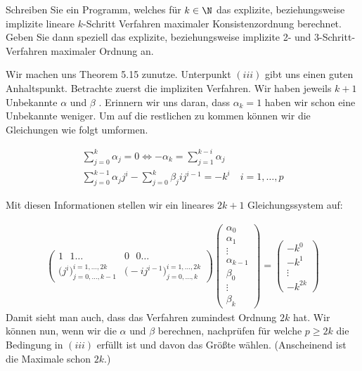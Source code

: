\begin{exercise}
Schreiben Sie ein Programm, welches für $k \in \N$ das explizite, beziehungsweise
implizite lineare $k$-Schritt Verfahren maximaler Konsistenzordnung berechnet. Geben Sie dann speziell
das explizite, beziehungsweise implizite 2- und 3-Schritt-Verfahren maximaler Ordnung an.
\end{exercise}
\begin{solution}
Wir machen uns Theorem 5.15 zunutze. 
Unterpunkt $(iii)$ gibt uns einen guten Anhaltspunkt. Betrachte zuerst die impliziten Verfahren.
Wir haben jeweils $k+1$ Unbekannte $\alpha$ und $\beta$ . Erinnern wir uns daran,
dass $\alpha_k = 1$ haben wir schon eine Unbekannte weniger. Um auf die restlichen
zu kommen können wir die Gleichungen wie folgt umformen.

\begin{align*}
  \sum_{j=0}^k \alpha_j = 0 \Leftrightarrow -\alpha_k = \sum_{j=1}^{k-i} \alpha_j \\
  \sum_{j=0}^{k-1}\alpha_j j^i - \sum_{j=0}^k \beta_j ij^{i-1} = -k^i \quad i=1,\dots,p
\end{align*}

Mit diesen Informationen stellen wir ein lineares $2k+1$ Gleichungssystem auf:

\begin{align*}
  \left(\begin{array}{c|c}
    1 \text{ }1\dots & 0\text{ } 0 \dots \\
    \hline
    \bigg( j^i\bigg)_{j=0,\dots,k-1}^{i=1,\dots,2k} & \bigg( -ij^{i-1}\bigg)_{j=0,\dots,k}^{i=1,\dots,2k}
  \end{array}\right)
  \left(\begin{array}{c}
    \alpha_0 \\
    \alpha_1 \\
    \vdots \\
    \alpha_{k-1} \\
    \beta_0 \\
    \vdots \\
    \beta_k
  \end{array}\right) =
  \left(\begin{array}{c}
    -k^0 \\
    -k^1 \\
    \vdots \\
    -k^{2k}
  \end{array}\right)
\end{align*}
Damit sieht man auch, dass das Verfahren zumindest Ordnung $2k$ hat. Wir können nun,
wenn wir die $\alpha$ und $\beta$ berechnen, nachprüfen für welche $p \geq 2k$ die Bedingung
in $(iii)$ erfüllt ist und davon das Größte wählen. (Anscheinend ist die Maximale schon $2k$.)


\end{solution}
